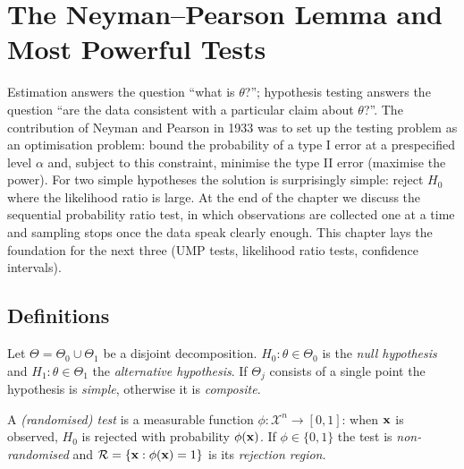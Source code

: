 \documentclass[main.tex]{subfiles}
\begin{document}
\chapter{The Neyman--Pearson Lemma and Most Powerful Tests}\label{ch:neyman-pearson}

Estimation answers the question ``what is $\theta$?''; hypothesis testing answers the question ``are the data consistent with a particular claim about $\theta$?''. The contribution of Neyman and Pearson in 1933 \cite{neyman-pearson33} was to set up the testing problem as an optimisation problem: bound the probability of a type I error at a prespecified level $\alpha$ and, subject to this constraint, minimise the type II error (maximise the power). For two simple hypotheses the solution is surprisingly simple: reject $H_0$ where the likelihood ratio is large. At the end of the chapter we discuss the sequential probability ratio test, in which observations are collected one at a time and sampling stops once the data speak clearly enough. This chapter lays the foundation for the next three (UMP tests, likelihood ratio tests, confidence intervals).

\section{Definitions}

\begin{definition}[Hypotheses]
Let $\Theta=\Theta_0\cup\Theta_1$ be a disjoint decomposition. $H_0:\theta\in\Theta_0$ is the \emph{null hypothesis} and $H_1:\theta\in\Theta_1$ the \emph{alternative hypothesis}. If $\Theta_j$ consists of a single point the hypothesis is \emph{simple}, otherwise it is \emph{composite}.
\end{definition}

\begin{definition}
A \emph{(randomised) test} is a measurable function $\phi:\mathcal X^n\to[0,1]$: when $\mathbf{x}$ is observed, $H_0$ is rejected with probability $\phi(\mathbf{x})$. If $\phi\in\{0,1\}$ the test is \emph{non-randomised} and $\mathcal R=\{\mathbf{x}:\phi(\mathbf{x})=1\}$ is its \emph{rejection region}.
\end{definition}
\end{document}
